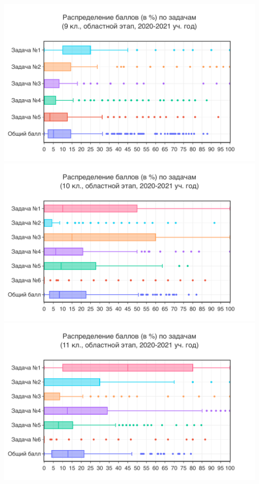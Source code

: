 \includegraphics[width=\linewidth]{../export/pdf/results/2023/oblast/grade9-dist-box.pdf}
\includegraphics[width=\linewidth]{../export/pdf/results/2023/oblast/grade10-dist-box.pdf}
\includegraphics[width=\linewidth]{../export/pdf/results/2023/oblast/grade11-dist-box.pdf}

